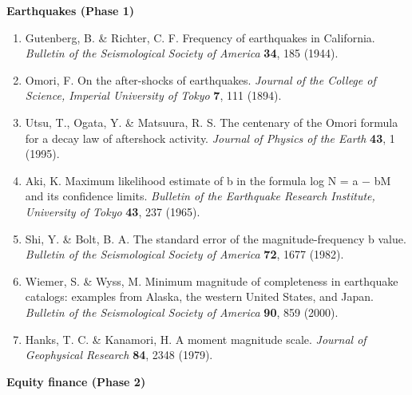 \documentclass[
  11pt]{article}
\providecommand{\tightlist}{%
  \setlength{\itemsep}{0pt}\setlength{\parskip}{0pt}}
\begin{document}
\textbf{Earthquakes (Phase 1)}

\begin{enumerate}
\def\labelenumi{\arabic{enumi}.}
\setcounter{enumi}{13}
\tightlist
\item
  Gutenberg, B. \& Richter, C. F. Frequency of earthquakes in
  California. \emph{Bulletin of the Seismological Society of America}
  \textbf{34}, 185 (1944).
\item
  Omori, F. On the after-shocks of earthquakes. \emph{Journal of the
  College of Science, Imperial University of Tokyo} \textbf{7}, 111
  (1894).
\item
  Utsu, T., Ogata, Y. \& Matsu\textquotesingle ura, R. S. The centenary
  of the Omori formula for a decay law of aftershock activity.
  \emph{Journal of Physics of the Earth} \textbf{43}, 1 (1995).
\item
  Aki, K. Maximum likelihood estimate of b in the formula log N = a − bM
  and its confidence limits. \emph{Bulletin of the Earthquake Research
  Institute, University of Tokyo} \textbf{43}, 237 (1965).
\item
  Shi, Y. \& Bolt, B. A. The standard error of the magnitude-frequency b
  value. \emph{Bulletin of the Seismological Society of America}
  \textbf{72}, 1677 (1982).
\item
  Wiemer, S. \& Wyss, M. Minimum magnitude of completeness in earthquake
  catalogs: examples from Alaska, the western United States, and Japan.
  \emph{Bulletin of the Seismological Society of America} \textbf{90},
  859 (2000).
\item
  Hanks, T. C. \& Kanamori, H. A moment magnitude scale. \emph{Journal
  of Geophysical Research} \textbf{84}, 2348 (1979).
\end{enumerate}

\textbf{Equity finance (Phase 2)}
\end{document}
